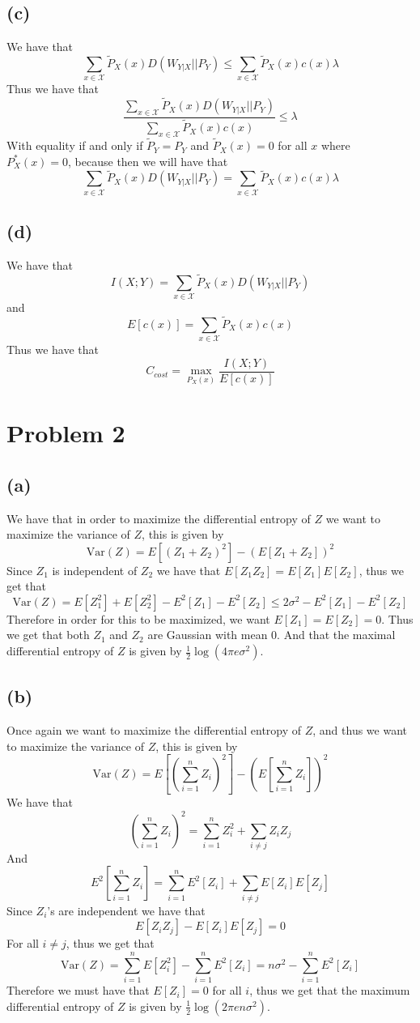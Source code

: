 \subsection*{(c)}
We have that
$$\sum_{x\in \mathcal{X}}\tilde{P}_X(x)D(W_{Y|X}||P_Y)\leq \sum_{x\in \mathcal{X}}\tilde{P}_X(x)c(x)\lambda$$
Thus we have that
$$\frac{\sum_{x\in \mathcal{X}}\tilde{P}_X(x)D(W_{Y|X}||P_Y)}{\sum_{x\in \mathcal{X}}\tilde{P}_X(x)c(x)}\leq \lambda$$
With equality if and only if $\tilde{P}_Y=P_Y$ and $\tilde{P}_X(x)=0$ for all 
$x$ where $P^*_X(x)=0$, because then we will have that 
$$\sum_{x\in \mathcal{X}}\tilde{P}_X(x)D(W_{Y|X}||P_Y)= \sum_{x\in \mathcal{X}}\tilde{P}_X(x)c(x)\lambda$$
\subsection*{(d)}
We have that 
$$I(X;Y)=\sum_{x\in \mathcal{X}}\tilde{P}_X(x)D(W_{Y|X}||P_Y)$$
and 
$$E[c(x)]=\sum_{x\in \mathcal{X}}\tilde{P}_X(x)c(x)$$
Thus we have that
$$C_{cost}=\max_{P_X(x)}\frac{I(X;Y)}{E[c(x)]}$$
\section*{Problem 2}
\subsection*{(a)}
We have that in order to maximize the 
differential entropy of $Z$ we want to maximize
the variance of $Z$, this is given by 
$$\text{Var}(Z)=E[(Z_1+Z_2)^2]-(E[Z_1+Z_2])^2$$
Since $Z_1$ is independent of $Z_2$ we have that
$E[Z_1Z_2]=E[Z_1]E[Z_2]$, thus we get that 
$$\text{Var}(Z)=E[Z_1^2]+E[Z_2^2]-E^2[Z_1]-E^2[Z_2]\leq 2\sigma^2 -E^2[Z_1]-E^2[Z_2]$$
Therefore in order for this to be maximized, we want $E[Z_1]=E[Z_2]=0$. 
Thus we get that both $Z_1$ and $Z_2$ are Gaussian with mean 0. And that 
the maximal differential entropy of $Z$ is given by $\frac{1}{2}\log(4\pi e\sigma^2)$.
\subsection*{(b)}
Once again we want to maximize the differential entropy of $Z$,
and thus we want to maximize the variance of $Z$, this is given by
$$\text{Var}(Z)=E[(\sum_{i=1}^{n}Z_i)^2]-(E[\sum_{i=1}^{n}Z_i])^2$$
We have that 
$$\left(\sum_{i=1}^{n}Z_i\right)^2=\sum_{i=1}^{n}Z_i^2+\sum_{i\neq j}Z_iZ_j$$
And
$$E^2[\sum_{i=1}^{n}Z_i]=\sum_{i=1}^{n}E^2[Z_i]+\sum_{i\neq j}E[Z_i]E[Z_j]$$
Since $Z_i$'s are independent we have that
$$E[Z_iZ_j]-E[Z_i]E[Z_j]=0$$
For all $i\neq j$, thus we get that
$$\text{Var}(Z)=\sum_{i=1}^{n}E[Z_i^2]-\sum_{i=1}^{n}E^2[Z_i]=n\sigma^2-\sum_{i=1}^{n}E^2[Z_i]$$
Therefore we must have that $E[Z_i]=0$ for all $i$, thus we get that
the maximum differential entropy of $Z$ is given by $\boxed{\frac{1}{2}\log(2\pi e n\sigma^2)}$.
